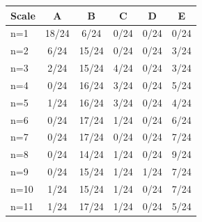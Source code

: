 \begin{tabular}{lccccc}
\toprule
Scale & \cellcolor[HTML]{FFFFFF} A & \cellcolor[HTML]{EA4646} B & \cellcolor[HTML]{9670BD} C & \cellcolor[HTML]{8FEB32} D & \cellcolor[HTML]{19C8C8} E \\
\midrule
n=1 & \cellcolor[HTML]{FFFFFF} 18/24 & \cellcolor[HTML]{EA4646} 6/24 & \cellcolor[HTML]{9670BD} 0/24 & \cellcolor[HTML]{8FEB32} 0/24 & \cellcolor[HTML]{19C8C8} 0/24 \\
n=2 & \cellcolor[HTML]{FFFFFF} 6/24 & \cellcolor[HTML]{EA4646} 15/24 & \cellcolor[HTML]{9670BD} 0/24 & \cellcolor[HTML]{8FEB32} 0/24 & \cellcolor[HTML]{19C8C8} 3/24 \\
n=3 & \cellcolor[HTML]{FFFFFF} 2/24 & \cellcolor[HTML]{EA4646} 15/24 & \cellcolor[HTML]{9670BD} 4/24 & \cellcolor[HTML]{8FEB32} 0/24 & \cellcolor[HTML]{19C8C8} 3/24 \\
n=4 & \cellcolor[HTML]{FFFFFF} 0/24 & \cellcolor[HTML]{EA4646} 16/24 & \cellcolor[HTML]{9670BD} 3/24 & \cellcolor[HTML]{8FEB32} 0/24 & \cellcolor[HTML]{19C8C8} 5/24 \\
n=5 & \cellcolor[HTML]{FFFFFF} 1/24 & \cellcolor[HTML]{EA4646} 16/24 & \cellcolor[HTML]{9670BD} 3/24 & \cellcolor[HTML]{8FEB32} 0/24 & \cellcolor[HTML]{19C8C8} 4/24 \\
n=6 & \cellcolor[HTML]{FFFFFF} 0/24 & \cellcolor[HTML]{EA4646} 17/24 & \cellcolor[HTML]{9670BD} 1/24 & \cellcolor[HTML]{8FEB32} 0/24 & \cellcolor[HTML]{19C8C8} 6/24 \\
n=7 & \cellcolor[HTML]{FFFFFF} 0/24 & \cellcolor[HTML]{EA4646} 17/24 & \cellcolor[HTML]{9670BD} 0/24 & \cellcolor[HTML]{8FEB32} 0/24 & \cellcolor[HTML]{19C8C8} 7/24 \\
n=8 & \cellcolor[HTML]{FFFFFF} 0/24 & \cellcolor[HTML]{EA4646} 14/24 & \cellcolor[HTML]{9670BD} 1/24 & \cellcolor[HTML]{8FEB32} 0/24 & \cellcolor[HTML]{19C8C8} 9/24 \\
n=9 & \cellcolor[HTML]{FFFFFF} 0/24 & \cellcolor[HTML]{EA4646} 15/24 & \cellcolor[HTML]{9670BD} 1/24 & \cellcolor[HTML]{8FEB32} 1/24 & \cellcolor[HTML]{19C8C8} 7/24 \\
n=10 & \cellcolor[HTML]{FFFFFF} 1/24 & \cellcolor[HTML]{EA4646} 15/24 & \cellcolor[HTML]{9670BD} 1/24 & \cellcolor[HTML]{8FEB32} 0/24 & \cellcolor[HTML]{19C8C8} 7/24 \\
n=11 & \cellcolor[HTML]{FFFFFF} 1/24 & \cellcolor[HTML]{EA4646} 17/24 & \cellcolor[HTML]{9670BD} 1/24 & \cellcolor[HTML]{8FEB32} 0/24 & \cellcolor[HTML]{19C8C8} 5/24 \\

\end{tabular}
